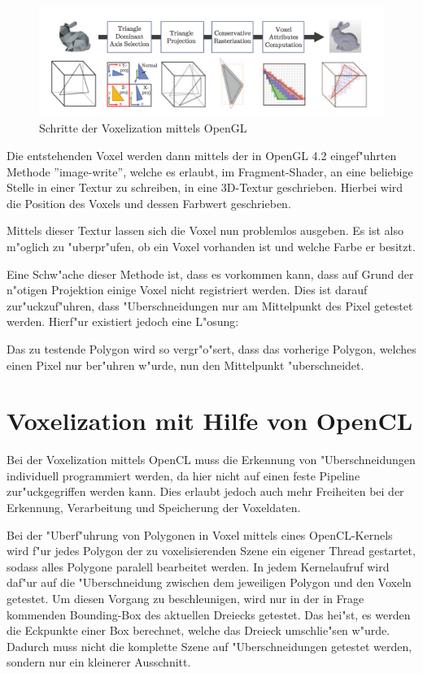 \documentclass[a4paper, 12pt]{scrartcl}
\begin{document}
\begin{figure}
	\centering
		\includegraphics[width=16cm]{Voxelization-Pipeline}
	\caption{Schritte der Voxelization mittels OpenGL}
\end{figure}

Die entstehenden Voxel werden dann mittels der in OpenGL 4.2 eingef"uhrten Methode ''image-write'', welche es erlaubt, im Fragment-Shader, an eine beliebige Stelle in einer Textur zu schreiben, in eine 3D-Textur geschrieben. Hierbei wird die Position des Voxels und dessen Farbwert geschrieben.


Mittels dieser Textur lassen sich die Voxel nun problemlos ausgeben. Es ist also m"oglich zu "uberpr"ufen, ob ein Voxel vorhanden ist und welche Farbe er besitzt.

Eine Schw"ache dieser Methode ist, dass es vorkommen kann, dass auf Grund der n"otigen Projektion einige Voxel nicht registriert werden. Dies ist darauf zur"uckzuf"uhren, dass "Uberschneidungen nur am Mittelpunkt des Pixel getestet werden. Hierf"ur existiert jedoch eine L"osung: 

Das zu testende Polygon wird so vergr"o"sert, dass das vorherige Polygon, welches einen Pixel nur ber"uhren w"urde, nun den Mittelpunkt "uberschneidet. 



\section{Voxelization mit Hilfe von OpenCL}
Bei der Voxelization mittels OpenCL muss die Erkennung von "Uberschneidungen individuell programmiert werden, da hier nicht auf einen feste Pipeline zur"uckgegriffen werden kann. Dies erlaubt jedoch auch mehr Freiheiten bei der Erkennung, Verarbeitung und Speicherung der Voxeldaten. 

Bei der "Uberf"uhrung von Polygonen in Voxel mittels eines OpenCL-Kernels wird f"ur jedes Polygon der zu voxelisierenden Szene ein eigener Thread gestartet, sodass alles Polygone paralell bearbeitet werden. In jedem Kernelaufruf wird daf"ur auf die "Uberschneidung zwischen dem jeweiligen Polygon und den Voxeln getestet. Um diesen Vorgang zu beschleunigen, wird nur in der in Frage kommenden Bounding-Box des aktuellen Dreiecks getestet.
Das hei"st, es werden die Eckpunkte einer Box berechnet, welche das Dreieck umschlie"sen w"urde. Dadurch muss nicht die komplette Szene auf "Uberschneidungen getestet werden, sondern nur ein kleinerer Ausschnitt.
\end{document}
